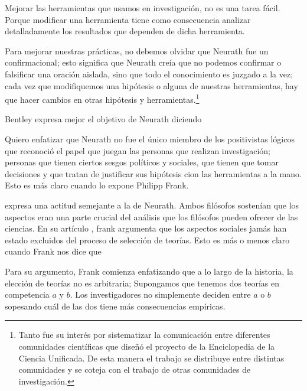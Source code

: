 Mejorar las herramientas que usamos en investigación, no es una tarea fácil. 
Porque modificar una herramienta tiene como consecuencia analizar detalladamente los resultados que dependen de dicha herramienta.

Para mejorar nuestras prácticas, no debemos olvidar que Neurath fue un  confirmacional; esto significa que Neurath creía que no podemos confirmar o falsificar una oración aislada, sino que todo el conocimiento es juzgado a la vez; cada vez que modifiquemos una hipótesis o alguna de nuestras herramientas, hay que hacer cambios en otras hipótesis y herramientas.\footnote{
	Tanto fue su interés por sistematizar la comunicación entre diferentes comunidades científicas que diseñó el proyecto de la Enciclopedia de la Ciencia Unificada.
	De esta manera el trabajo se distribuye entre distintas comunidades y se coteja con el trabajo de otras comunidades de investigación.
	}

Bentley expresa mejor el objetivo de Neurath diciendo  \parencite[p. 41]{Bentley2023}

Quiero enfatizar que Neurath no fue el único miembro de los positivistas lógicos que reconoció el papel que juegan las personas que realizan investigación; 
personas que tienen ciertos sesgos políticos y sociales, que tienen que tomar decisiones y que tratan de justificar sus hipótesis cion las herramientas a la mano.
Esto es más claro cuando lo expone Philipp Frank.



 expresa una actitud semejante a la de Neurath.
Ambos filósofos sostenían que los aspectos  eran una parte crucial del análisis que los filósofos pueden ofrecer de las ciencias.
En su artículo , frank argumenta que los aspectos sociales jamás han estado excluidos del proceso de selección de teorías.
Esto es más o menos claro cuando Frank nos dice que  \parencite[p. 143]{Frank1954}

Para su argumento, Frank comienza enfatizando que a lo largo de la historia, la elección de teorías no es arbitraria;
Supongamos que tenemos dos teorías en competencia $a$ y $b$.
Los investigadores no simplemente deciden entre $a$ o $b$ sopesando cuál de las dos tiene más consecuencias empíricas.


